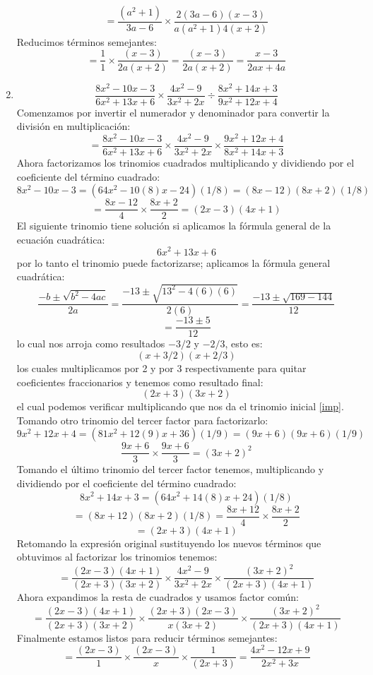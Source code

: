 \documentclass[12pt]{article}
\begin{document}
\begin{enumerate}[label=\bfseries Ejercicio \arabic*:]
$$= \frac{(a^2 + 1)}{3a -6} \times \frac{2(3a - 6)(x - 3)}{a(a^2 +1)4(x + 2)}$$
Reducimos términos semejantes:
$$= \frac{1}{1} \times \frac{(x - 3)}{2a(x + 2)} = \frac{(x - 3)}{2a(x + 2)}  = \frac{x - 3}{2ax + 4a}$$
  \item $$\frac{8x^2 - 10x -3}{6x^2 +13x + 6} \times \frac{4x^2 - 9}{3x^2 + 2x} \div \frac{8x^2 + 14x + 3}{9x^2 + 12x + 4}$$
Comenzamos por invertir el numerador y denominador para convertir la división en multiplicación:
$$= \frac{8x^2 - 10x -3}{6x^2 +13x + 6} \times \frac{4x^2 - 9}{3x^2 + 2x} \times \frac{9x^2 + 12x + 4}{8x^2 + 14x + 3}$$
Ahora factorizamos los trinomios cuadrados multiplicando y dividiendo por el coeficiente del término cuadrado:
$$8x^2 - 10x -3 = (64x^2 - 10(8)x - 24)(1/8) = (8x - 12)(8x + 2)(1/8)$$
$$ = \frac{8x - 12}{4} \times \frac{8x + 2}{2} = (2x - 3)(4x + 1)$$
El siguiente trinomio tiene solución si aplicamos la fórmula general de la ecuación cuadrática: 
\begin{equation}\label{imp}
  6x^2 +13x + 6
\end{equation}
por lo tanto el trinomio puede factorizarse; aplicamos la fórmula general cuadrática:
$$\frac{-b \pm \sqrt{b^2 - 4ac}}{2a} = \frac{-13 \pm \sqrt{13^2 - 4(6)(6)}}{2(6)} = \frac{-13 \pm \sqrt{169 - 144}}{12}$$
$$= \frac{-13 \pm 5}{12}$$
lo cual nos arroja como resultados $-3/2$ y $-2/3$, esto es:
$$(x + 3/2)(x + 2/3)$$
los cuales multiplicamos por 2 y por 3 respectivamente para quitar coeficientes fraccionarios y tenemos como resultado final:
$$(2x + 3)(3x + 2)$$
el cual podemos verificar multiplicando que nos da el trinomio inicial \ref{imp}.
Tomando otro trinomio del tercer factor para factorizarlo:
$$9x^2 + 12x + 4 = (81x^2 + 12(9)x + 36)(1/9) = (9x + 6)(9x + 6)(1/9)$$
$$\frac{9x + 6}{3} \times \frac{9x + 6}{3} = (3x + 2)^2$$
Tomando el último trinomio del tercer factor tenemos, multiplicando y dividiendo por el coeficiente del término cuadrado:
$$8x^2 + 14x + 3 = (64x^2 + 14(8)x + 24)(1/8)$$
$$= (8x + 12)(8x + 2)(1/8) = \frac{8x + 12}{4} \times \frac{8x + 2}{2}$$
$$= (2x + 3)(4x + 1)$$
Retomando la expresión original sustituyendo los nuevos términos que obtuvimos al factorizar los trinomios tenemos:
$$ = \frac{(2x - 3)(4x + 1)}{(2x + 3)(3x + 2)} \times \frac{4x^2 - 9}{3x^2 + 2x} \times \frac{(3x + 2)^2}{(2x + 3)(4x + 1)}$$
Ahora expandimos la resta de cuadrados y usamos factor común:
$$ = \frac{(2x - 3)(4x + 1)}{(2x + 3)(3x + 2)} \times \frac{(2x + 3)(2x -3)}{x(3x + 2)} \times \frac{(3x + 2)^2}{(2x + 3)(4x + 1)}$$
Finalmente estamos listos para reducir términos semejantes:
$$ = \frac{(2x - 3)}{1} \times \frac{(2x -3)}{x} \times \frac{1}{(2x + 3)} = \frac{4x^2 - 12x + 9}{2x^2 + 3x}$$

\end{enumerate}
\end{document}
